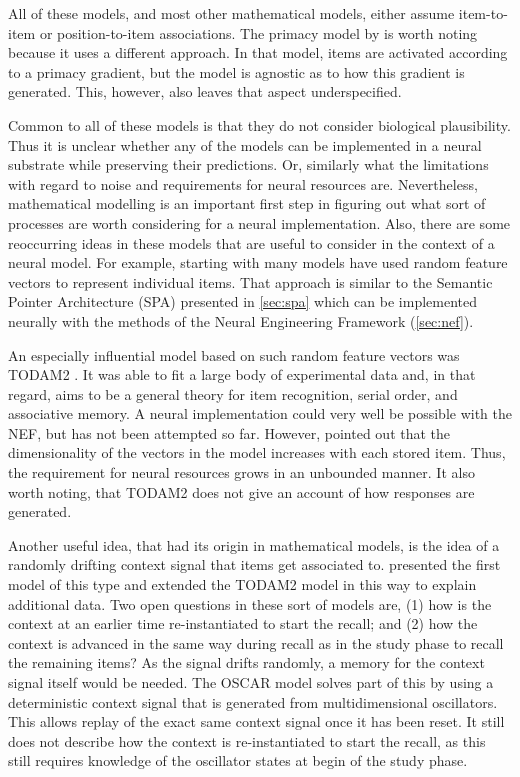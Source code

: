 All of these models, and most other mathematical models, either assume item-to-item or position-to-item associations.
The primacy model by \textcite{Page1998} is worth noting because it uses a different approach.
In that model, items are activated according to a primacy gradient, but the model is agnostic as to how this gradient is generated.
This, however, also leaves that aspect underspecified.

Common to all of these models is that they do not consider biological plausibility.
Thus it is unclear whether any of the models can be implemented in a neural substrate while preserving their predictions.
Or, similarly what the limitations with regard to noise and requirements for neural resources are.
Nevertheless, mathematical modelling is an important first step in figuring out what sort of processes are worth considering for a neural implementation.
Also, there are some reoccurring ideas in these models that are useful to consider in the context of a neural model.
For example, starting with \textcite{Anderson1973} many models have used random feature vectors to represent individual items.
That approach is similar to the Semantic Pointer Architecture (SPA) presented in \cref{sec:spa} which can be implemented neurally with the methods of the Neural Engineering Framework (\cref{sec:nef}).

An especially influential model based on such random feature vectors was \mbox{TODAM2} \parencite{Murdock1993}.
It was able to fit a large body of experimental data and, in that regard, aims to be a general theory for item recognition, serial order, and associative memory.
A neural implementation could very well be possible with the NEF, but has not been attempted so far.
However, \textcite{Choo2010} pointed out that the dimensionality of the vectors in the model increases with each stored item.
Thus, the requirement for neural resources grows in an unbounded manner.
It also worth noting, that \mbox{TODAM2} does not give an account of how responses are generated.

Another useful idea, that had its origin in mathematical models, is the idea of a randomly drifting context signal that items get associated to.
\Textcite{Estes1955} presented the first model of this type and \textcite{Murdock1997} extended the \mbox{TODAM2} model in this way to explain additional data.
Two open questions in these sort of models are, (1) how is the context at an earlier time re-instantiated to start the recall;
and (2) how the context is advanced in the same way during recall as in the study phase to recall the remaining items?
As the signal drifts randomly, a memory for the context signal itself would be needed.
The OSCAR model \parencite{Brown2000} solves part of this by using a deterministic context signal that is generated from multidimensional oscillators.
This allows replay of the exact same context signal once it has been reset.
It still does not describe how the context is re-instantiated to start the recall, as this still requires knowledge of the oscillator states at begin of the study phase.

